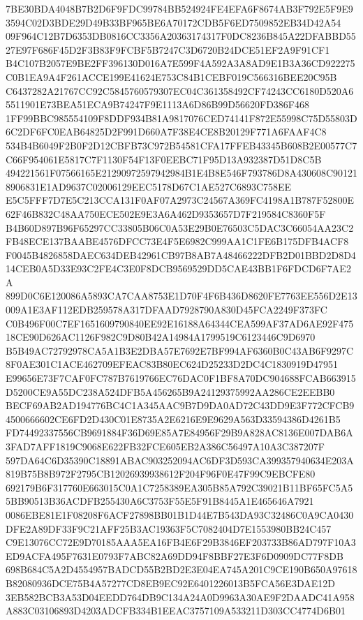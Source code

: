 \documentclass[UTF8,fontset=fandol,zihao=-4,a4paper]{ctexart}
\begin{document}
{{7BE30BDA4048B7B2D6F9FDC99784BB524924FE4EFA6F8674AB3F792E5F9E93594C02D3BDE29D49B33BF965BE6A70172CDB5F6ED7509852EB34D42A54
09F964C12B7D6353DB0816CC3356A20363174317F0DC8236B845A22DFABBD5527E97F686F45D2F3B83F9FCBF5B7247C3D6720B24DCE51EF2A9F91CF1
B4C107B2057E9BE2FF396130D016A7E599F4A592A3A8AD9E1B3A36CD922275C0B1EA9A4F261ACCE199E41624E753C84B1CEBF019C566316BEE20C95B
C6437282A21767CC92C5845760579307EC04C361358492CF74243CC6180D520A65511901E73BEA51ECA9B74247F9E1113A6D86B99D56620FD386F468
1FF99BBC985554109F8DDF934B81A9817076CED74141F872E55998C75D55803D6C2DF6FC0EAB64825D2F991D660A7F38E4CE8B20129F771A6FAAF4C8
534B4B6049F2B0F2D12CBFB73C972B54581CFA17FFEB43345B608B2E00577C7C66F954061E5817C7F1130F54F13F0EEBC71F95D13A932387D51D8C5B
494221561F07566165E21290972597942984B1E4B8E546F793786D8A430608C901218906831E1AD9637C02006129EEC5178D67C1AE527C6893C758EE
E5C5FFF7D7E5C213CCA131F0AF07A2973C24567A369FC4198A1B787F52800E62F46B832C48AA750ECE502E9E3A6A462D9353657D7F219584C8360F5F
B4B60D897B96F65297CC33805B06C0A53E29B0E76503C5DAC3C66054AA23C2FB48ECE137BAABE4576DFCC73E4F5E6982C999AA1C1FE6B175DFB4ACF8
F0045B4826858DAEC634DEB42961CB97B8AB7A48466222DFB2D01BBD2D8D414CEB0A5D33E93C2FE4C3E0F8DCB9569529DD5CAE43BB1F6FDCD6F7AE2A
899D0C6E120086A5893CA7CAA8753E1D70F4F6B436D8620FE7763EE556D2E13009A1E3AF112EDB259578A317DFAAD7928790A830D45FCA2249F373FC
C0B496F00C7EF1651609790840EE92E16188A64344CEA599AF37AD6AE92F47518CE90D626AC1126F982C9D80B42A14984A1799519C6123446C9D6970
B5B49AC72792978CA5A1B3E2DBA57E7692E7BF994AF6360B0C43AB6F9297C8F0AE301C1ACE462709EFEAC83B80EC624D25233D2DC4C1830919D47951
E99656E73F7CAF0FC787B7619766EC76DAC0F1BF8A70DC904688FCAB663915D5200CE9A55DC238A524DFB5A456265B9A24129375992AA286CE2EEBB0
BECF69AB2AD194776BC4C1A345AAC9B7D9DA0AD72C43DD9E3F772CFCB94500666602CE6FD2D430C01E8735A2E6216E9E9629A563D33594386D4261B5
FD74492337556CB9691884F36D69E85A7E84956F29B9A828AC8136E007DAB6A3FAD7AFF1819C9068E622FB32FCE605EB2A386C56497A10A3C387207F
597DA64C6D35390C18891ABAC903252094AC6DF3D593CA399357940634E203A819B75B8B972F2795CB12026939938612F204F96F0E47F99C9EBCFE80
692179B6F317760E663015C0A1C7258389EA305B85A792C39021B11BF65FC5A55BB90513B36ACDFB255430A6C3753F55E5F91B8445A1E465646A7921
0086EBE81E1F08208F6ACF27898BB01B1D44E7B543DA93C32486C0A9CA0430DFE2A89DF33F9C21AFF25B3AC19363F5C7082404D7E1553980BB24C457
C9E13076CC72E9D70185AAA5EA16FB4E6F29B3846EF203733B86AD797F10A3ED9ACFA495F7631E0793F7ABC82A69DD94F8BBF27E3F6D0909DC77F8DB
698B684C5A2D4554957BADCD55B2BD2E3E04EA745A201C9CE190B650A97618B82080936DCE75B4A57277CD8EB9EC92E6401226013B5FCA56E3DAE12D
3EB582BCB3A53D04EEDD764DB9C134A24A0D9963A30AE9F2DAADC41A958A883C03106893D4203ADCFB334B1EEAC3757109A533211D303CC4774D6B01
}}
\end{document}
